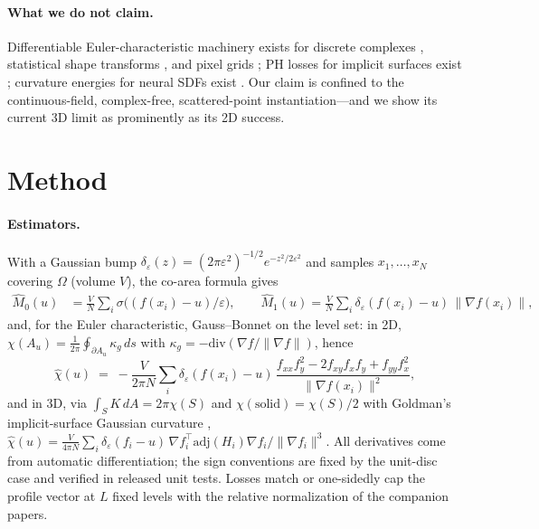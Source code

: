 \documentclass[10pt]{article}
\begin{document}
\paragraph{What we do not claim.} Differentiable Euler-characteristic machinery
exists for discrete complexes \citep{roell2024dect}, statistical shape transforms
\citep{marsh2022sect}, and pixel grids \citep{minkloss2026}; PH losses for implicit
surfaces exist \citep{stitch2024,dong2022topologycad}; curvature energies for neural
SDFs exist \citep{neurcadrecon2024,gropp2020igr}. Our claim is confined to the
continuous-field, complex-free, scattered-point instantiation---and we show its
current 3D limit as prominently as its 2D success.

\section{Method}
\label{sec:method}

\paragraph{Estimators.} With a Gaussian bump
$\delta_\varepsilon(z)=(2\pi\varepsilon^2)^{-1/2}e^{-z^2/2\varepsilon^2}$ and samples
$x_1,\dots,x_N$ covering $\Omega$ (volume $V$), the co-area formula gives
\begin{align}
\hat M_0(u) &= \tfrac{V}{N}\textstyle\sum_i \sigma\!\big((f(x_i)-u)/\varepsilon\big),
\qquad
\hat M_1(u) = \tfrac{V}{N}\textstyle\sum_i
\delta_\varepsilon(f(x_i)-u)\,\lVert\nabla f(x_i)\rVert,
\label{eq:m01}
\end{align}
and, for the Euler characteristic, Gauss--Bonnet on the level set: in 2D,
$\chi(A_u)=\frac{1}{2\pi}\oint_{\partial A_u}\kappa_g\,ds$ with
$\kappa_g=-\mathrm{div}(\nabla f/\lVert\nabla f\rVert)$, hence
\begin{equation}
\hat\chi(u) \;=\; -\frac{V}{2\pi N}\sum_i
\delta_\varepsilon(f(x_i)-u)\,
\frac{f_{xx}f_y^2 - 2f_{xy}f_xf_y + f_{yy}f_x^2}{\lVert\nabla f(x_i)\rVert^{2}},
\label{eq:chi2d}
\end{equation}
and in 3D, via $\int_S K\,dA = 2\pi\chi(S)$ and $\chi(\text{solid})=\chi(S)/2$ with
Goldman's implicit-surface Gaussian curvature \citep{goldman2005curvature},
$\hat\chi(u) = \frac{V}{4\pi N}\sum_i \delta_\varepsilon(f_i-u)\,
\nabla f_i^{\!\top}\mathrm{adj}(H_i)\nabla f_i / \lVert\nabla f_i\rVert^{3}$.
All derivatives come from automatic differentiation; the sign conventions are fixed
by the unit-disc case and verified in released unit tests. Losses match or one-sidedly
cap the profile vector at $L$ fixed levels with the relative normalization of the
companion papers.
\end{document}
